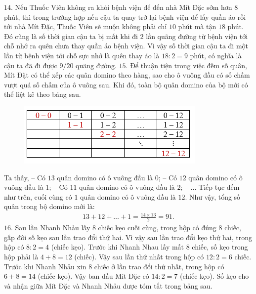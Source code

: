 \vskip 0.1cm
$14.$
Nếu Thuốc Viên không ra khỏi bệnh viện để đến nhà Mít Đặc sớm hơn $8$ phút, thì trong trường hợp nếu cậu ta quay trở lại bệnh viện để lấy quần áo rồi tới nhà Mít Đặc, Thuốc Viên sẽ muộn không phải chỉ $10$ phút mà tận $18$ phút. Đó cũng là số thời gian cậu ta bị mất khi đi $2$ lần quãng đường từ bệnh viện tới chỗ nhớ ra quên chưa thay quần áo bệnh viện. Vì vậy số thời gian cậu ta đi một lần từ bệnh viện tới chỗ sực nhớ là quên thay áo là $18 : 2 = 9$ phút, có nghĩa là cậu ta đã đi được $9/20$ quãng đường.
\vskip 0.1cm
$15.$
Để thuận tiện trong việc đếm số quân, Mít Đặt có thể xếp các quân domino theo hàng, sao cho ô vuông đầu có số chấm vượt quá số chấm của ô vuông sau. Khi đó, toàn bộ quân domino của bộ mới có thể liệt kê theo bảng sau.
\begin{figure}[H]
	\centering
	\vspace*{-5pt}
	\captionsetup{labelformat= empty, justification=centering}
	\includegraphics[width=0.9\linewidth]{11}
	\vspace*{-15pt}
\end{figure}
Ta thấy,
\vskip 0.1cm
-- Có $13$ quân domino có ô vuông đầu là $0$;
\vskip 0.1cm
-- Có $12$ quân domino có ô vuông đầu là $1$;
\vskip 0.1cm
-- Có $11$ quân domino có ô vuông đầu là $2$;
\vskip 0.1cm
-- $\ldots$
\vskip 0.1cm
Tiếp tục đếm như trên, cuối cùng có $1$ quân domino có ô vuông đầu là $12$.
\vskip 0.1cm
Như vậy, tổng số quân trong bộ domino mới là:
\begin{align*}
	13 + 12 + \ldots + 1 = \frac{14\times13}{2}=91.
\end{align*}
$16.$
Sau lần Nhanh Nhảu lấy $8$ chiếc kẹo cuối cùng, trong hộp có đúng $8$ chiếc, gấp đôi số kẹo sau lần trao đổi thứ hai. Vì vậy sau lần trao đổi kẹo thứ hai, trong hộp có $8:2=4$ (chiếc kẹo). Trước khi Nhanh Nhau lấy mất $8$ chiếc, số kẹo trong hộp phải là $4+8 = 12$ (chiếc). Vậy sau lần
thứ nhất trong hộp có $12:2 = 6$ chiếc. Trước khi Nhanh Nhảu xin $8$ chiếc ở lần trao đổi thứ nhất, trong hộp có $6+8=14$ (chiếc kẹo). Vậy ban đầu Mít Đặc có $14:2=7$ (chiếc kẹo).
\vskip 0.1cm
Số kẹo cho và nhận giữa Mít Đặc và Nhanh Nhảu được tóm tắt trong bảng sau.
